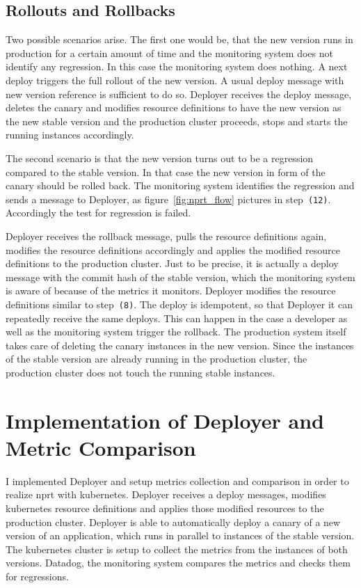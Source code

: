 \section{Rollouts and Rollbacks}

Two possible scenarios arise. The first one would be, that the new version runs in
production for a certain amount of time and the monitoring system does not identify any
regression. In this case the monitoring system does nothing. A next deploy triggers the
full rollout of the new version. A usual deploy message with new version reference is
sufficient to do so. Deployer receives the deploy message, deletes the canary and modifies
resource definitions to have the new version as the new stable version and the production
cluster proceeds, stops and starts the running instances accordingly.

The second scenario is that the new version turns out to be a regression compared to the
stable version. In that case the new version in form of the canary should be rolled
back. The monitoring system identifies the regression and sends a message to Deployer, as
figure~\ref{fig:nprt_flow} pictures in step~\texttt{(12)}. Accordingly the test for
regression is failed.

Deployer receives the rollback message, pulls the resource definitions again, modifies the
resource definitions accordingly and applies the modified resource definitions to the
production cluster. Just to be precise, it is actually a deploy message with the commit
hash of the stable version, which the monitoring system is aware of because of the metrics
it monitors. Deployer modifies the resource definitions similar to step~\texttt{(8)}. The
deploy is idempotent, so that Deployer it can repeatedly receive the same deploys. This
can happen in the case a developer as well as the monitoring system trigger the
rollback. The production system itself takes care of deleting the canary instances in the
new version. Since the instances of the stable version are already running in the
production cluster, the production cluster does not touch the running stable instances.

\chapter{Implementation of Deployer and Metric Comparison}
\label{chap:detail}

I implemented Deployer and setup metrics collection and comparison in order to realize
\gls{nprt} with kubernetes. Deployer receives a deploy messages, modifies kubernetes
resource definitions and applies those modified resources to the production
cluster. Deployer is able to automatically deploy a canary of a new version of an
application, which runs in parallel to instances of the stable version. The kubernetes
cluster is setup to collect the metrics from the instances of both versions. Datadog, the
monitoring system compares the metrics and checks them for regressions.

